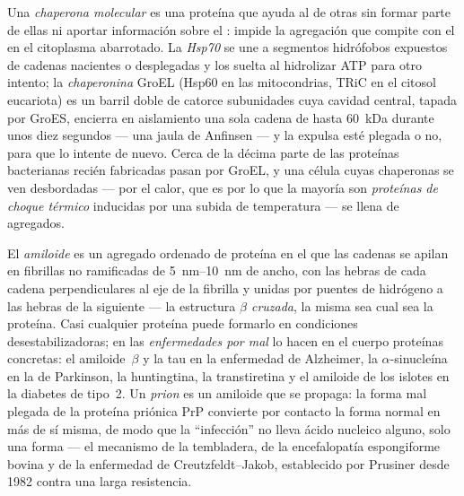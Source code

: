 \begin{definition}[Chaperonas]\label{def:b3:structural-biology:chaperones}
Una \emph{chaperona molecular} es una proteína que ayuda al 
de otras sin formar parte de ellas ni aportar información sobre el
: impide la agregación que compite con el  en el
citoplasma abarrotado. La \emph{Hsp70} se une a segmentos hidrófobos
expuestos de cadenas nacientes o desplegadas y los suelta al hidrolizar
ATP para otro intento; la \emph{chaperonina} GroEL (Hsp60 en las
mitocondrias, TRiC en el citosol eucariota) es un barril doble de catorce
subunidades cuya cavidad central, tapada por GroES, encierra en
aislamiento una sola cadena de hasta \qty{60}{kDa} durante unos diez
segundos --- una jaula de Anfinsen --- y la expulsa esté plegada o no,
para que lo intente de nuevo. Cerca de la décima parte de las proteínas
bacterianas recién fabricadas pasan por GroEL, y una célula cuyas
chaperonas se ven desbordadas --- por el calor, que es por lo que la
mayoría son \emph{proteínas de choque térmico} inducidas por una subida
de temperatura --- se llena de agregados.
\end{definition}

\begin{definition}[Amiloide]\label{def:b3:structural-biology:amyloid}
El \emph{amiloide} es un agregado ordenado de proteína en el que las
cadenas se apilan en fibrillas no ramificadas de \qtyrange{5}{10}{nm} de
ancho, con las hebras de cada cadena perpendiculares al eje de la
fibrilla y unidas por puentes de hidrógeno a las hebras de la siguiente
--- la estructura \emph{$\beta$ cruzada}, la misma sea cual sea la
proteína. Casi cualquier proteína puede formarlo en condiciones
desestabilizadoras; en las \emph{enfermedades por mal } lo
hacen en el cuerpo proteínas concretas: el amiloide~$\beta$ y la tau en
la enfermedad de Alzheimer, la $\alpha$-sinucleína en la de Parkinson, la
huntingtina, la transtiretina y el amiloide de los islotes en la diabetes
de tipo~2. Un \emph{prion} es un amiloide que se propaga: la forma mal
plegada de la proteína priónica PrP convierte por contacto la forma
normal en más de sí misma, de modo que la ``infección'' no lleva ácido
nucleico alguno, solo una forma --- el mecanismo de la tembladera, de la
encefalopatía espongiforme bovina y de la enfermedad de
Creutzfeldt--Jakob, establecido por Prusiner desde 1982 contra una larga
resistencia.
\end{definition}

